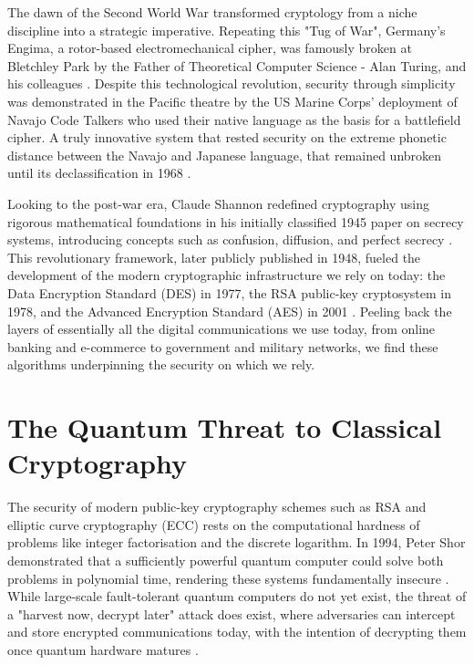 \documentclass[10pt, a4paper]{report}
\begin{document}
The dawn of the Second World War transformed cryptology from a niche discipline into a strategic imperative. Repeating this "Tug of War", Germany's Engima, a rotor-based electromechanical cipher, was famously broken at Bletchley Park by the Father of Theoretical Computer Science - Alan Turing, and his colleagues \cite{Hodges2014}. Despite this technological revolution, security through simplicity was demonstrated in the Pacific theatre by the US Marine Corps' deployment of Navajo Code Talkers who used their native language as the basis for a battlefield cipher. A truly innovative system that rested security on the extreme phonetic distance between the Navajo and Japanese language, that remained unbroken until its declassification in 1968 \cite{Huffman2000}. 

Looking to the post-war era, Claude Shannon redefined cryptography using rigorous mathematical foundations in his initially classified 1945 paper on secrecy systems, introducing concepts such as confusion, diffusion, and perfect secrecy \cite{Shannon1945}. This revolutionary framework, later publicly published in 1948, fueled the development of the modern cryptographic infrastructure we rely on today: the Data Encryption Standard (DES) in 1977, the RSA public-key cryptosystem in 1978, and the Advanced Encryption Standard (AES) in 2001 \cite{Shannon1948, DiffieHellman1976, RSA1978}. Peeling back the layers of essentially all the digital communications we use today, from online banking and e-commerce to government and military networks, we find these algorithms underpinning the security on which we rely. 

\section{The Quantum Threat to Classical Cryptography}

The security of modern public-key cryptography schemes such as RSA and elliptic curve cryptography (ECC) rests on the computational hardness of problems like integer factorisation and the discrete logarithm. In 1994, Peter Shor demonstrated that a sufficiently powerful quantum computer could solve both problems in polynomial time, rendering these systems fundamentally insecure \cite{Shor1997}. While large-scale fault-tolerant quantum computers do not yet exist, the threat of a "harvest now, decrypt later" attack does exist, where adversaries can intercept and store encrypted communications today, with the intention of decrypting them once quantum hardware matures \cite{NIST}.
\end{document}
